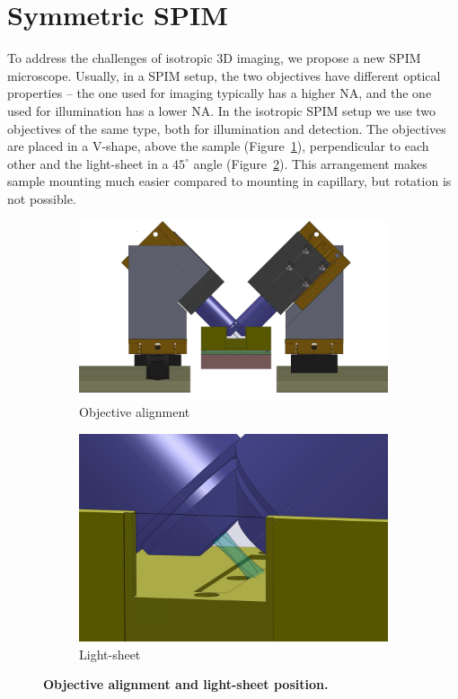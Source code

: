 \documentclass{diploma_style}
\begin{document}
\section{Symmetric SPIM}
To address the challenges of isotropic 3D imaging, we propose a new SPIM microscope. Usually, in a SPIM setup, the two objectives have different optical properties -- the one used for imaging typically has a higher NA, and the one used for illumination has a lower NA. In the isotropic SPIM setup we use two objectives of the same type, both for illumination and detection. The objectives are placed in a V-shape, above the sample (Figure~\ref{fig:objectives1}), perpendicular to each other and the light-sheet in a $45^\circ$ angle (Figure~\ref{fig:objectives2}). This arrangement makes sample mounting much easier compared to mounting in capillary, but rotation is not possible.
\begin{figure}[tp]
	\centering
	\begin{subfigure}[b]{0.49\textwidth}
		\centering
		\includegraphics[width=\textwidth]{figures/2_spim/Image01}
		\caption{Objective alignment}
		\label{fig:objectives1}
	\end{subfigure}
	\begin{subfigure}[b]{0.49\textwidth}
		\centering
		\includegraphics[width=\textwidth]{figures/2_spim/Image04}
		\caption{Light-sheet}
		\label{fig:objectives2}
	\end{subfigure}
	\caption{\textbf{Objective alignment and light-sheet position.}}
	\label{fig:objectives}
\end{figure}
\end{document}
